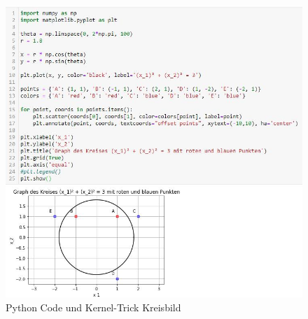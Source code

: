 \documentclass[12pt]{article}
\begin{document}
\begin{figure}[tp]
  \centering
  \hspace*{-0.1cm} 
  \includegraphics[width=1.1\textwidth]{SVM-Kreisbild-Python}
  \caption{Python Code und Kernel-Trick Kreisbild}       
  \label{fig:SVM_Kreis}
\end{figure}
%
\newpage
\end{document}
